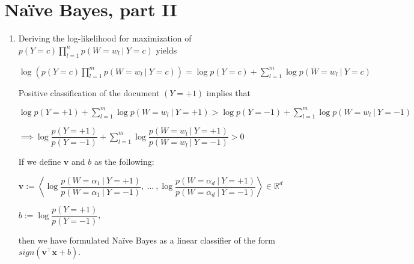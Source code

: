 \documentclass{article}
\begin{document}
\section{Na\"{i}ve Bayes, part II}
\begin{enumerate}[label=(\alph*)]

\item Deriving the log-likelihood for maximization of $p(Y = c)\prod_{l = 1}^{n}p(W = w_l\:|\:Y = c)$ yields 
\begin{center}$\log(p(Y = c)\prod_{l = 1}^{m}p(W = w_l\:|\:Y = c)) = \log{p(Y = c)} + \sum_{l = 1}^{m}\log{p(W = w_l\:|\:Y = c)}$\end{center}
Positive classification of the document $(Y = +1)$ implies that
\begin{center}$\log{p(Y = +1)} + \sum_{l = 1}^{m}\log{p(W = w_l\:|\:Y = +1)} > \log{p(Y = -1)} + \sum_{l = 1}^{m}\log{p(W = w_l\:|\:Y = -1)}$ \end{center}
\begin{center}$\implies \log{\dfrac{p(Y = +1)}{p(Y = -1)}} + \sum_{l = 1}^{m}\log{\dfrac{p(W = w_l\:|\:Y = +1)}{p(W = w_l\:|\:Y = -1)}} > 0$ \end{center}
If we define $\mathbf{v}$ and $b$ as the following:
\begin{center}$\mathbf{v} := \left\langle\log{\dfrac{p(W = \alpha_1\:|\:Y = +1)}{p(W = \alpha_1\:|\:Y = -1)}},\:...\:,
\log{\dfrac{p(W = \alpha_d\:|\:Y = +1)}{p(W = \alpha_d\:|\:Y = -1)}}\right\rangle \in \mathds{R}^d$ \end{center}
\begin{center}$b := \log{\dfrac{p(Y = +1)}{p(Y = -1)}}$,\end{center}
then we have formulated Na\"{i}ve Bayes as a linear classifier of the form $sign(\mathbf{v}^\intercal \mathbf{x} + b).$


\end{enumerate}
\end{document}
